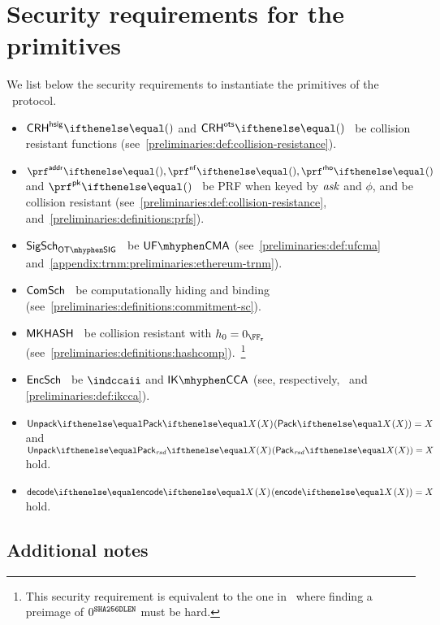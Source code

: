 
\section{Security requirements for the primitives}\label{zeth-protocol:sec-req}

We list below the security requirements to instantiate the primitives of the \zeth~protocol.

\begin{itemize}
    \item $\crhhsig{}$ and $\crhots{}$ \MUST~be collision resistant functions (see~\cref{preliminaries:def:collision-resistance}).
    \item $\prfaddr{}{}, \prfnf{}{}, \prfrho{}{}$ and $\prfpk{}{}$ \MUST~be PRF when keyed by $\mathit{ask}$ and $\phi$, and be collision resistant (see~\cref{preliminaries:def:collision-resistance}, and~\cref{preliminaries:definitions:prfs}).
    \item $\otsigscheme$ \MUST~be $\ufcma$ (see~\cref{preliminaries:def:ufcma} and~\cref{appendix:trnm:preliminaries:ethereum-trnm}).
    \item $\mathsf{ComSch}$ \MUST~be computationally hiding and binding (see~\cref{preliminaries:definitions:commitment-sc}).
    \item $\mathsf{MKHASH}$ \MUST~be collision resistant with $h_0 = {0}_{\FFx{\rCURVE}}$ (see~\cref{preliminaries:definitions:hashcomp}).~\footnote{This security requirement is equivalent to the one in~\cite[Section 5.4.1.3]{zcashprotocol} where finding a preimage of $0^{\mathtt{SHA256DLEN}}$ must be hard.}
    \item $\mathsf{EncSch}$ \MUST~be $\indccaii$ and $\ikcca$ (see, respectively,~\cite[Definition 8]{abdalla1999dhaes} and \cref{preliminaries:def:ikcca}).
    \item $\unpack{\pack{X}{}}{} = X$ and $\unpack{\packResBits{X}}{} = X$ \MUST{} hold.
    \item $\decode{\encode{X}{}}{} = X$ \MUST{} hold.
\end{itemize}

\subsection{Additional notes}\label{zeth-protocol:sec-req:add-notes}

